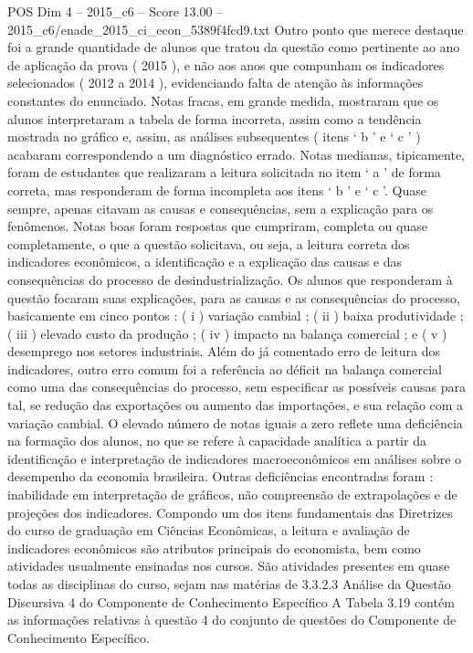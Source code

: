 \begin{textsample}{POS Dim 4 – 2015\_c6 – Score 13.00 – 2015\_c6/enade\_2015\_ci\_econ\_5389f4fcd9.txt}
Outro ponto que merece destaque foi a grande quantidade de alunos que tratou da questão como pertinente ao ano de aplicação da prova ( 2015 ), e não aos anos que compunham os indicadores selecionados ( 2012 a 2014 ), evidenciando falta de atenção às informações constantes do enunciado.
Notas fracas, em grande medida, mostraram que os alunos interpretaram a tabela de forma incorreta, assim como a tendência mostrada no gráfico e, assim, as análises subsequentes ( itens ‘ b ’ e ‘ c ’ ) acabaram correspondendo a um diagnóstico errado.
Notas medianas, tipicamente, foram de estudantes que realizaram a leitura solicitada no item ‘ a ’ de forma correta, mas responderam de forma incompleta aos itens ‘ b ’ e ‘ c ’.
Quase sempre, apenas citavam as causas e consequências, sem a explicação para os fenômenos.
Notas boas foram respostas que cumpriram, completa ou quase completamente, o que a questão solicitava, ou seja, a leitura correta dos indicadores econômicos, a identificação e a explicação das causas e das consequências do processo de desindustrialização.
Os alunos que responderam à questão focaram suas explicações, para as causas e as consequências do processo, basicamente em cinco pontos : ( i ) variação cambial ; ( ii ) baixa produtividade ; ( iii ) elevado custo da produção ; ( iv ) impacto na balança comercial ; e ( v ) desemprego nos setores industriais.
Além do já comentado erro de leitura dos indicadores, outro erro comum foi a referência ao déficit na balança comercial como uma das consequências do processo, sem especificar as possíveis causas para tal, se redução das exportações ou aumento das importações, e sua relação com a variação cambial.
O elevado número de notas iguais a zero reflete uma deficiência na formação dos alunos, no que se refere à capacidade analítica a partir da identificação e interpretação de indicadores macroeconômicos em análises sobre o desempenho da economia brasileira.
Outras deficiências encontradas foram : inabilidade em interpretação de gráficos, não compreensão de extrapolações e de projeções dos indicadores.
Compondo um dos itens fundamentais das Diretrizes do curso de graduação em Ciências Econômicas, a leitura e avaliação de indicadores econômicos são atributos principais do economista, bem como atividades usualmente ensinadas nos cursos.
São atividades presentes em quase todas as disciplinas do curso, sejam nas matérias de 3.3.2.3 Análise da Questão Discursiva 4 do Componente de Conhecimento Específico A Tabela 3.19 contém as informações relativas à questão 4 do conjunto de questões do Componente de Conhecimento Específico.

\end{textsample}
